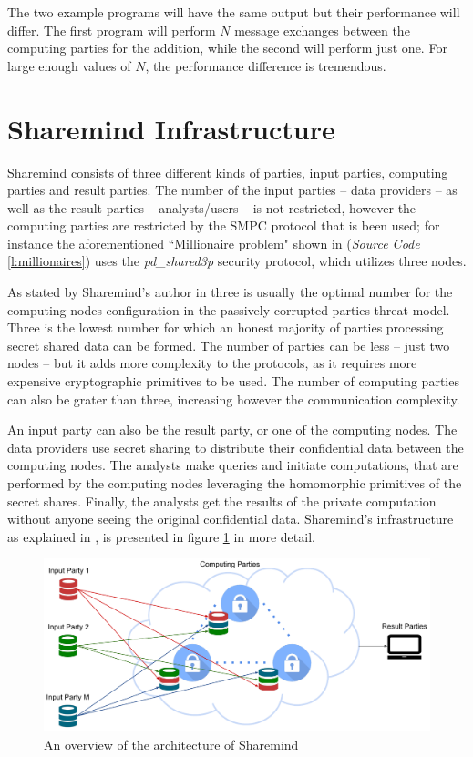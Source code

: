 The two example programs will have the same output but their performance will differ.
The first program will perform $N$ message exchanges between the computing parties for the addition, while the second will perform just one.
For large enough values of $N$, the performance difference is tremendous.



\section{Sharemind Infrastructure}\label{sharemind-infrastructure}
Sharemind consists of three different kinds of parties, input parties, computing parties and result parties.
The number of the input parties -- data providers -- as well as the result parties -- analysts/users -- is not restricted, however the computing parties are restricted by the SMPC protocol that is been used; for instance the aforementioned ``Millionaire problem" shown in (\textit{Source Code} \ref{l:millionaires}) uses the \textit{pd\_shared3p} security protocol, which utilizes three nodes.

As stated by Sharemind's author in \cite{bogdanov2013sharemind} three is usually the optimal number for the computing nodes configuration in the passively corrupted parties threat model.
Three is the lowest number for which an honest majority of parties processing secret shared data can be formed.
The number of parties can be less -- just two nodes -- but it adds more complexity to the protocols, as it requires more expensive cryptographic primitives to be used.
The number of computing parties can also be grater than three, increasing however the communication complexity.

An input party can also be the result party, or one of the computing nodes.
The data providers use secret sharing to distribute their confidential data between the computing nodes.
The analysts make queries and initiate computations, that are performed by the computing nodes leveraging the homomorphic primitives of the secret shares.
Finally, the analysts get the results of the private computation without anyone seeing the original confidential data.
Sharemind's infrastructure as explained in \cite{turban2014secure}, is presented in figure \ref{f:sharemind} in more detail.


\begin{figure}[th]
  \centering
  \includegraphics[width=\linewidth]{figures/sharemind_infrastructure.pdf}
  \caption{An overview of the architecture of Sharemind}\label{f:sharemind}
\end{figure}


